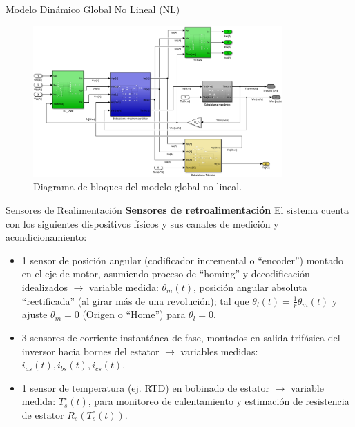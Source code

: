 \documentclass[12pt]{beamer}
\begin{document}
\begin{frame}{Modelo Dinámico Global No Lineal (NL)}
    \begin{figure}[h]
    \centering
    \includegraphics[width=0.85\textwidth]{Imagenes/Diagrama_Global_NoLineal.png}
    \caption{Diagrama de bloques del modelo global no lineal.}
    \end{figure}
\end{frame}

\begin{frame}{Sensores de Realimentación}\footnotesize
\textbf{Sensores de retroalimentación}
El sistema cuenta con los siguientes dispositivos físicos y sus canales de medición y acondicionamiento:
\begin{itemize}
\item 1 sensor de posición angular (codificador incremental o ``encoder'') montado en el eje de motor, asumiendo proceso de ``homing'' y decodificación idealizados $\rightarrow$ variable medida: $\theta_m(t)$, posición angular absoluta ``rectificada'' (al girar más de una revolución); tal que $\theta_l(t) = \frac{1}{r}\theta_m(t)$ y ajuste $\theta_m = 0$ (Origen o ``Home'') para $\theta_l = 0$.
\item 3 sensores de corriente instantánea de fase, montados en salida trifásica del inversor hacia bornes del estator $\rightarrow$ variables medidas: $i_{as}(t), i_{bs}(t), i_{cs}(t)$.
\item 1 sensor de temperatura (ej. RTD) en bobinado de estator $\rightarrow$ variable medida: $T^\circ_s(t)$, para monitoreo de calentamiento y estimación de resistencia de estator $R_s\left(T^\circ_s(t)\right)$.
\end{itemize}
\end{frame}
\end{document}
